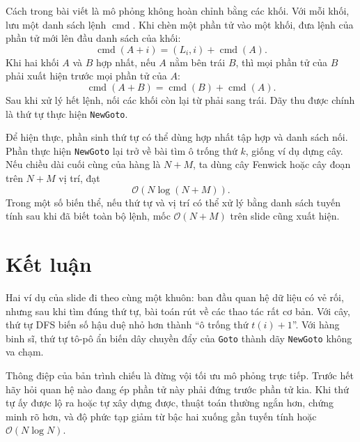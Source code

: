 \documentclass[11pt]{article}
\newcommand{\Oh}{\mathcal{O}}
\begin{document}
Cách trong bài viết là mô phỏng không hoàn chỉnh bằng các khối. Với mỗi khối,
lưu một danh sách lệnh \(\operatorname{cmd}\). Khi chèn một phần tử vào một
khối, đưa lệnh của phần tử mới lên đầu danh sách của khối:
\[
  \operatorname{cmd}(A+i)=(L_i,i)+\operatorname{cmd}(A).
\]
Khi hai khối \(A\) và \(B\) hợp nhất, nếu \(A\) nằm bên trái \(B\), thì mọi
phần tử của \(B\) phải xuất hiện trước mọi phần tử của \(A\):
\[
  \operatorname{cmd}(A+B)=\operatorname{cmd}(B)+\operatorname{cmd}(A).
\]
Sau khi xử lý hết lệnh, nối các khối còn lại từ phải sang trái. Dãy thu được
chính là thứ tự thực hiện \texttt{NewGoto}.

Để hiện thực, phần sinh thứ tự có thể dùng hợp nhất tập hợp và danh sách nối.
Phần thực hiện \texttt{NewGoto} lại trở về bài tìm ô trống thứ \(k\), giống
ví dụ dựng cây. Nếu chiều dài cuối cùng của hàng là \(N+M\), ta dùng cây
Fenwick hoặc cây đoạn trên \(N+M\) vị trí, đạt
\[
  \Oh(N\log(N+M)).
\]
Trong một số biến thể, nếu thứ tự và vị trí có thể xử lý bằng danh sách tuyến
tính sau khi đã biết toàn bộ lệnh, mốc \(\Oh(N+M)\) trên slide cũng xuất hiện.

\section{Kết luận}

Hai ví dụ của slide đi theo cùng một khuôn: ban đầu quan hệ dữ liệu có vẻ
rối, nhưng sau khi tìm đúng thứ tự, bài toán rút về các thao tác rất cơ bản.
Với cây, thứ tự DFS biến số hậu duệ nhỏ hơn thành ``ô trống thứ \(t(i)+1\)''.
Với hàng binh sĩ, thứ tự tô-pô ẩn biến dây chuyền đẩy của \texttt{Goto} thành
dãy \texttt{NewGoto} không va chạm.

Thông điệp của bản trình chiếu là đừng vội tối ưu mô phỏng trực tiếp. Trước
hết hãy hỏi quan hệ nào đang ép phần tử này phải đứng trước phần tử kia. Khi
thứ tự ấy được lộ ra hoặc tự xây dựng được, thuật toán thường ngắn hơn, chứng
minh rõ hơn, và độ phức tạp giảm từ bậc hai xuống gần tuyến tính hoặc
\(\Oh(N\log N)\).
\end{document}
